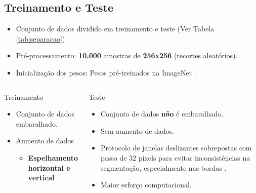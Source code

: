 \documentclass[%
  10pt,%
  aspectratio = 169,%
  compress,%
  t,%
  english,%
  brazilian,%
  tikz,
]{beamer}
\begin{document}
\subsection{Treinamento e Teste}\label{ssec:matmet7}

\begin{frame}
\begin{itemize}
    \item Conjunto de dados dividido em treinamento e teste (Ver Tabela \ref{tab:separacao}).
    \item Pré-processamento: \textbf{10.000} amostras de \textbf{256x256} (recortes aleatórios).
    \item Inicialização dos pesos: Pesos pré-treinados na ImageNet \cite{Imagenet2009}.
\end{itemize}

\begin{columns}[T]

\begin{block}{Treinamento}
    \begin{itemize}
        \item Conjunto de dados embaralhado.
        \item Aumento de dados
        \begin{itemize}
            \item \textbf{Espelhamento horizontal e vertical}
        \end{itemize}
    \end{itemize}
\end{block}

\begin{block}{Teste}
    \begin{itemize}
        \item Conjunto de dados \textbf{não} é embaralhado.
        \item Sem aumento de dados.
        \item Protocolo de janelas deslizantes sobrepostas com passo de 32 pixels para evitar inconsistências na segmentação, especialmente nas bordas \cite{Farhangfar2019}.
        \item Maior esforço computacional.
    \end{itemize}
\end{block}

\end{columns}
\end{frame}
\end{document}
